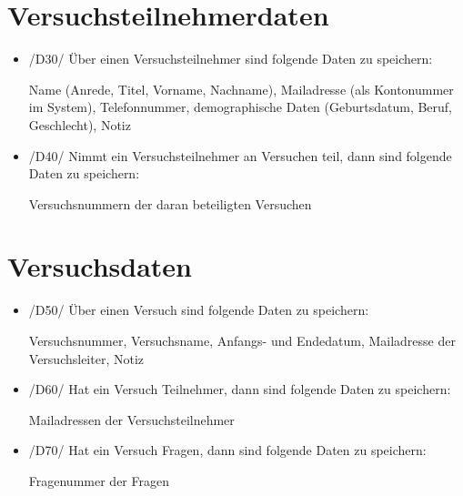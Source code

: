 \documentclass[a4paper]{scrreprt}
\begin{document}
        \section{Versuchsteilnehmerdaten}
            \begin{itemize}
                \item /D30/ Über einen Versuchsteilnehmer sind folgende Daten zu speichern:
                    \par Name (Anrede, Titel, Vorname, Nachname), Mailadresse (als Kontonummer im System), Telefonnummer, demographische Daten (Geburtsdatum, Beruf, Geschlecht), Notiz
                
                \item /D40/ Nimmt ein Versuchsteilnehmer an Versuchen teil, dann sind folgende Daten zu speichern:
                    \par Versuchsnummern der daran beteiligten Versuchen
            \end{itemize}
            
        \section{Versuchsdaten}
            \begin{itemize}
                \item /D50/ Über einen Versuch sind folgende Daten zu speichern:
                    \par Versuchsnummer, Versuchsname, Anfangs- und Endedatum, Mailadresse der Versuchsleiter, Notiz
                    
                \item /D60/ Hat ein Versuch Teilnehmer, dann sind folgende Daten zu speichern:
                    \par Mailadressen der Versuchsteilnehmer
                    
                \item /D70/ Hat ein Versuch Fragen, dann sind folgende Daten zu speichern:
                    \par Fragenummer der Fragen
            \end{itemize}
            
\end{document}
